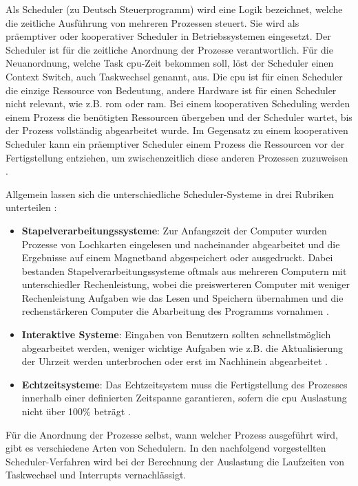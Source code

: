 \documentclass[../EDF Master Thesis.tex]{subfiles}
\begin{document}
Als Scheduler (zu Deutsch Steuerprogramm) wird eine Logik bezeichnet, welche die zeitliche Ausführung von mehreren Prozessen steuert.
Sie wird als präemptiver oder kooperativer Scheduler in Betriebssystemen eingesetzt.
Der Scheduler ist für die zeitliche Anordnung der Prozesse verantwortlich.
Für die Neuanordnung, welche Task \ac{cpu}-Zeit bekommen soll, löst der Scheduler einen Context Switch, auch Taskwechsel genannt, aus.
Die \ac{cpu} ist für einen Scheduler die einzige Ressource von Bedeutung, andere Hardware ist für einen Scheduler nicht relevant, wie z.B. \ac{rom} oder \ac{ram}.
Bei einem kooperativen Scheduling werden einem Prozess die benötigten Ressourcen übergeben und der Scheduler wartet, bis der Prozess vollständig abgearbeitet wurde.
Im Gegensatz zu einem kooperativen Scheduler kann ein präemptiver Scheduler einem Prozess die Ressourcen vor der Fertigstellung entziehen, um zwischenzeitlich diese anderen Prozessen zuzuweisen \parencite{mikrocontroller:001}.

Allgemein lassen sich die unterschiedliche Scheduler-Systeme in drei Rubriken unterteilen \parencite{wiki:007}:
\begin{itemize}
    \item \textbf{Stapelverarbeitungssysteme}: Zur Anfangszeit der Computer wurden Prozesse von Lochkarten eingelesen und nacheinander abgearbeitet und die Ergebnisse auf einem Magnetband abgespeichert oder ausgedruckt.
                                               Dabei bestanden Stapelverarbeitungssysteme oftmals aus mehreren Computern mit unterschiedler Rechenleistung, wobei die preiswerteren Computer mit weniger Rechenleistung Aufgaben wie das Lesen und Speichern übernahmen und die rechenstärkeren Computer die Abarbeitung des Programms vornahmen \autocite{grundkurs_betriebssysteme}.
    \item \textbf{Interaktive Systeme}: Eingaben von Benutzern sollten schnellstmöglich abgearbeitet werden, weniger wichtige Aufgaben wie z.B. die Aktualisierung der Uhrzeit werden unterbrochen oder erst im Nachhinein abgearbeitet \autocite{mikrocontroller:002}.
    \item \textbf{Echtzeitsysteme}: Das Echtzeitsystem muss die Fertigstellung des Prozesses innerhalb einer definierten Zeitspanne garantieren, sofern die \ac{cpu} Auslastung nicht über 100\% beträgt \autocite{mikrocontroller:002}.
\end{itemize}

Für die Anordnung der Prozesse selbst, wann welcher Prozess ausgeführt wird, gibt es verschiedene Arten von Schedulern.
In den nachfolgend vorgestellten Scheduler-Verfahren wird bei der Berechnung der Auslastung die Laufzeiten von Taskwechsel und Interrupts vernachlässigt.
\end{document}

